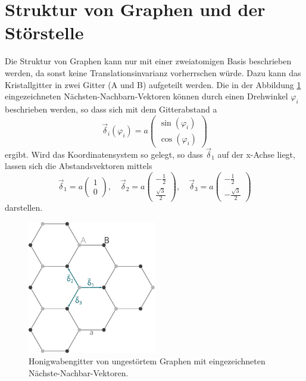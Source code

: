 \section{Struktur von Graphen und der Störstelle}
Die Struktur von Graphen kann nur mit einer zweiatomigen Basis beschrieben werden, da sonst keine Translationsinvarianz vorherrschen würde.
Dazu kann das Kristallgitter in zwei Gitter (A und B) aufgeteilt werden.
Die in der Abbildung \ref{fig:graphene_lattice} eingezeichneten Nächsten-Nachbarn-Vektoren können durch einen Drehwinkel $\varphi_i$ beschrieben werden, so dass sich 
mit dem Gitterabstand a
\begin{equation*}
    \vec{\delta}_i(\varphi_i) = a\begin{pmatrix} \sin (\varphi_i) \\ \cos (\varphi_i)     \end{pmatrix}
\end{equation*}
ergibt.
Wird das Koordinatensystem so gelegt, so dass $\vec{\delta}_1$ auf der x-Achse liegt, lassen sich die Abstandsvektoren mittels 
\begin{equation*}
    \vec{\delta}_1 = a \begin{pmatrix} 1            \\[4pt] 0                   \end{pmatrix}, \quad
    \vec{\delta}_2 = a \begin{pmatrix} -\frac{1}{2} \\[4pt] \frac{\sqrt{3}}{2}  \end{pmatrix}, \quad 
    \vec{\delta}_3 = a \begin{pmatrix} -\frac{1}{2} \\[4pt] -\frac{\sqrt{3}}{2} \end{pmatrix}
\end{equation*}
darstellen. \\
\begin{figure}
    \centering
    \includegraphics[width = 0.5\textwidth]{Plots/graphene_lattice.pdf}
    \caption{Honigwabengitter von ungestörtem Graphen mit eingezeichneten Nächste-Nachbar-Vektoren.}
    \label{fig:graphene_lattice}
\end{figure}
